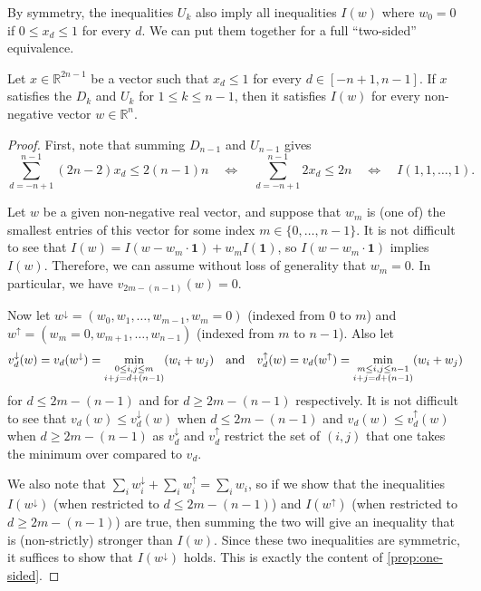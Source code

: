 \documentclass[letterpaper,reqno,11pt]{amsart}
\begin{document}
By symmetry, the inequalities $U_k$ also imply all inequalities $I(w)$ where $w_0 =0$ if $0\leq x_d\leq 1$ for every $d$. We can put them together for a full ``two-sided'' equivalence.

\begin{proposition}\label{prop:two-sided}
    Let $x\in \mathbb{R}^{2n-1}$ be a vector such that $ x_d\leq 1$ for every $d\in [-n+1, n-1]$. If $x$ satisfies the $D_k$ and $U_k$ for $1\leq k\leq n-1$, then it satisfies $I(w)$ for every non-negative vector $w\in \mathbb{R}^n$.
\end{proposition}

\begin{proof}
    First, note that summing $D_{n-1}$ and $U_{n-1}$ gives \[\sum_{d=-n+1}^{n-1} (2n-2)x_d \leq 2(n-1)n \quad \Leftrightarrow\quad \sum_{d=-n+1}^{n-1} 2x_d \leq 2n \quad \Leftrightarrow\quad I(1,1,\dots,1).\]
    
    Let $w$ be a given non-negative real vector, and suppose that $w_m$ is (one of) the smallest entries of this vector for some index $m\in \{0, \dots, n-1\}$. It is not difficult to see that $I(w) = I(w - w_m\cdot \mathbf{1}) + w_m I(\mathbf{1})$, so $I(w-w_m\cdot \mathbf{1})$ implies $I(w)$. Therefore, we can assume without loss of generality that $w_m = 0$. In particular, we have $v_{2m-(n-1)}(w) = 0$.

    Now let $w^{\downarrow} = (w_0, w_1, \dots, w_{m-1}, w_m=0)$ (indexed from $0$ to $m$) and $w^{\uparrow} = (w_m = 0, w_{m+1}, \dots, w_{n-1})$ (indexed from $m$ to $n-1$). 
    Also let \[v_d^{\downarrow}(w) =v_d(w^{\downarrow})= \min_{\substack{0\leq i, j\leq m\\ i+j=d+(n-1)}} (w_i+w_j) \text{\quad and\quad} v_d^{\uparrow}(w) = v_d(w^{\uparrow}) = \min_{\substack{m\leq i, j\leq n-1\\ i+j=d+(n-1)}} (w_i+w_j)\] for $d\leq 2m-(n-1)$ and for $d\geq 2m-(n-1)$ respectively. It is not difficult to see that $v_d(w) \leq v_d^{\downarrow}(w)$ when $d\leq 2m-(n-1)$ and $v_d(w)\leq v_d^{\uparrow}(w)$ when $d\geq 2m-(n-1)$ as $v_d^{\downarrow}$ and $v_d^{\uparrow}$ restrict the set of $(i, j)$ that one takes the minimum over compared to $v_d$.
    
    We also note that $\sum_{i} w^{\downarrow}_i + \sum_{i} w^{\uparrow}_i = \sum_{i} w_i$, so if we show that the inequalities $I(w^{\downarrow})$ (when restricted to $d\leq 2m-(n-1)$) and $I(w^{\uparrow})$ (when restricted to $d\geq 2m-(n-1)$) are true, then summing the two will give an inequality that is (non-strictly) stronger than $I(w)$. Since these two inequalities are symmetric, it suffices to show that $I(w^{\downarrow})$ holds. This is exactly the content of \cref{prop:one-sided}.
\end{proof}
\end{document}
